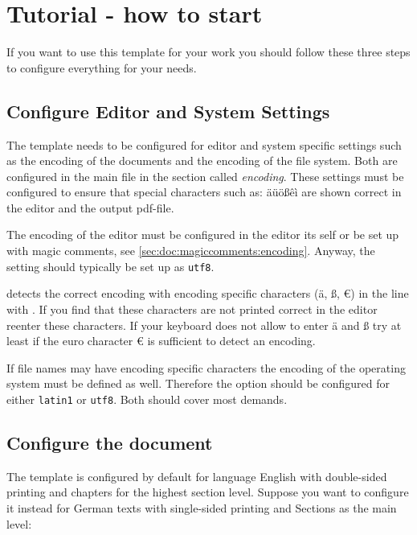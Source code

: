 \section{Tutorial - how to start}
\label{sec:doc:start}

If you want to use this template for your work you should follow these three steps to configure everything for your needs.

\subsection{Configure Editor and System Settings}
\label{sec:doc:config:editor}

The template needs to be configured for editor and system specific settings such as the encoding of the documents and the encoding of the file system. Both are configured in the main file in the section called \emph{encoding}.
These settings must be configured to ensure that special characters such as: äüößêì are shown correct in the editor and the output pdf-file.

The encoding of the editor must be configured in the editor its self or be set up with magic comments, see \cref{sec:doc:magiccomments:encoding}. Anyway, the setting should typically be set up as \texttt{utf8}.

\latex detects the correct encoding with encoding specific characters (ä, ß, €) in the line with . If you find that these characters are not printed correct in the editor reenter these characters. If your keyboard does not allow to enter ä and ß try at least if the euro character € is sufficient to detect an encoding. 

If file names may have encoding specific characters the encoding of the operating system must be defined as well. Therefore the option  should be configured for either \texttt{latin1} or \texttt{utf8}. Both should cover most demands.

\subsection{Configure the document}
\label{sec:doc:config:latex}
The template is configured by default for language English with double-sided printing and chapters for the highest section level. Suppose you want to configure it instead for German texts with single-sided printing and Sections as the main level:

